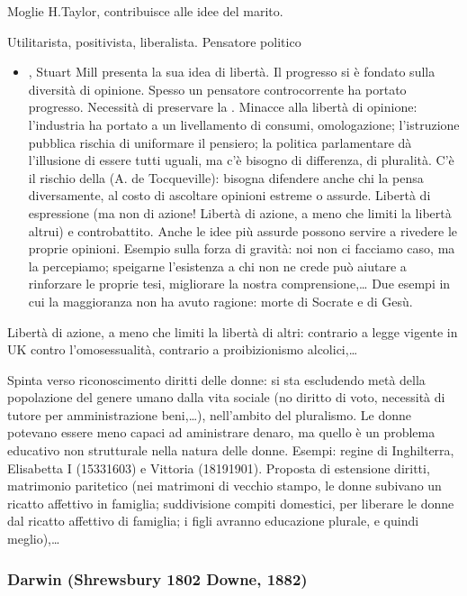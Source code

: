 \documentclass[letterpaper,10pt,italian]{jupyterBook}
\begin{document}
\sphinxAtStartPar
{} Moglie H.Taylor, contribuisce alle idee del marito.

\sphinxAtStartPar
{} Utilitarista, positivista, liberalista. Pensatore politico
\begin{itemize}
\item {} 
 , Stuart Mill presenta la sua idea di libertà. Il progresso si è fondato sulla diversità di opinione. Spesso un pensatore controcorrente ha portato progresso. Necessità di preservare la . Minacce alla libertà di opinione: l’industria ha portato a un livellamento di consumi, omologazione; l’istruzione pubblica rischia di uniformare il pensiero; la politica parlamentare dà l’illusione di essere tutti uguali, ma c’è bisogno di differenza, di pluralità. C’è il rischio della  (A. de Tocqueville): bisogna difendere anche chi la pensa diversamente, al costo di ascoltare opinioni estreme o assurde. Libertà di espressione (ma non di azione! Libertà di azione, a meno che limiti la libertà altrui) e controbattito. Anche le idee più assurde possono servire a rivedere le proprie opinioni. Esempio sulla forza di gravità: noi non ci facciamo caso, ma la percepiamo; speigarne l’esistenza a chi non ne crede può aiutare a rinforzare le proprie tesi, migliorare la nostra comprensione,…
Due esempi in cui la maggioranza non ha avuto ragione: morte di Socrate e di Gesù.

\end{itemize}

\sphinxAtStartPar
Libertà di azione, a meno che limiti la libertà di altri: contrario a legge vigente in UK contro l’omosessualità, contrario a proibizionismo alcolici,…

\sphinxAtStartPar
Spinta verso riconoscimento diritti delle donne: si sta escludendo metà della popolazione del genere umano dalla vita sociale (no diritto di voto, necessità di tutore per amministrazione beni,…), nell’ambito del pluralismo. Le donne potevano essere meno capaci ad aministrare denaro, ma quello è un problema educativo non strutturale nella natura delle donne. Esempi: regine di Inghilterra, Elisabetta I (1533\sphinxhyphen{}1603) e Vittoria (1819\sphinxhyphen{}1901). Proposta di estensione diritti, matrimonio paritetico (nei matrimoni di vecchio stampo, le donne subivano un ricatto affettivo in famiglia; suddivisione compiti domestici, per liberare le donne dal ricatto affettivo di famiglia; i figli avranno educazione plurale, e quindi meglio),…
\label{\detokenize{ch/history:pc-darwin}}\subsubsection*{Darwin (Shrewsbury 1802 \sphinxhyphen{} Downe, 1882)}
\end{document}
